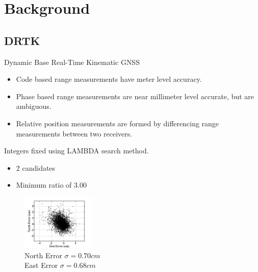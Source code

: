 \documentclass{beamer}
\begin{document}

\section{Background}

  \subsection{DRTK}

    \begin{frame}{Dynamic Base Real-Time Kinematic GNSS}
      \begin{itemize} \footnotesize
        \item Code based range measurements have meter level accuracy.
        \item Phase based range measurements are near millimeter level accurate, but are ambiguous.
        \item Relative position measurements are formed by differencing range measurements between two receivers.
      \end{itemize}
      \begin{minipage}{0.45\linewidth}
        \small Integers fixed using LAMBDA search method.
        \begin{itemize} \footnotesize
          \item 2 candidates
          \item Minimum ratio of 3.00
        \end{itemize}
      \end{minipage}
      \begin{minipage}{0.45\linewidth}
        \begin{figure} \centering
        \includegraphics[width=3.5cm]{../graphics/drtk_errors.png}
        \caption{ \footnotesize North Error $\sigma=0.70cm$\\East Error $\sigma=0.68cm$ }
        \end{figure}
      \end{minipage}
    \end{frame}
\end{document}
